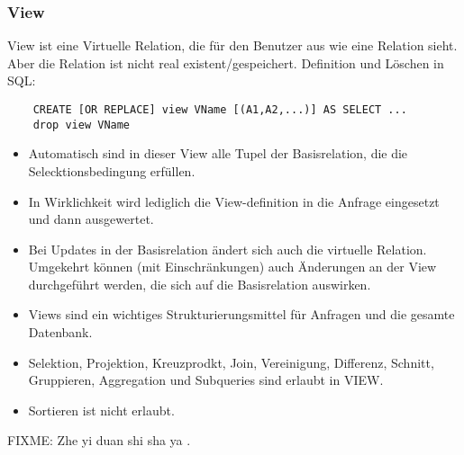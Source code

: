 \subsubsection{View}
View ist eine Virtuelle Relation, die f\"ur den Benutzer aus wie eine Relation sieht. Aber die Relation ist nicht real existent/gespeichert. Definition und L\"oschen in SQL:
\begin{verbatim}
    CREATE [OR REPLACE] view VName [(A1,A2,...)] AS SELECT ...
    drop view VName
\end{verbatim}
\begin{remark}
    \begin{itemize}
        \item Automatisch sind in dieser View alle Tupel der Basisrelation, die die Selecktionsbedingung erf\"ullen.
        \item In Wirklichkeit wird lediglich die View-definition in die Anfrage eingesetzt und dann ausgewertet.
        \item Bei Updates in der Basisrelation \"andert sich auch die virtuelle Relation. Umgekehrt k\"onnen (mit Einschr\"ankungen) auch \"Anderungen an der View durchgef\"uhrt werden, die sich auf die Basisrelation auswirken.
        \item Views sind ein wichtiges Strukturierungsmittel f\"ur Anfragen und die gesamte Datenbank.
        \item Selektion, Projektion, Kreuzprodkt, Join, Vereinigung, Differenz, Schnitt, Gruppieren, Aggregation und Subqueries sind erlaubt in VIEW.
        \item Sortieren ist nicht erlaubt.
    \end{itemize}
\end{remark}

FIXME: Zhe yi duan shi sha ya .

